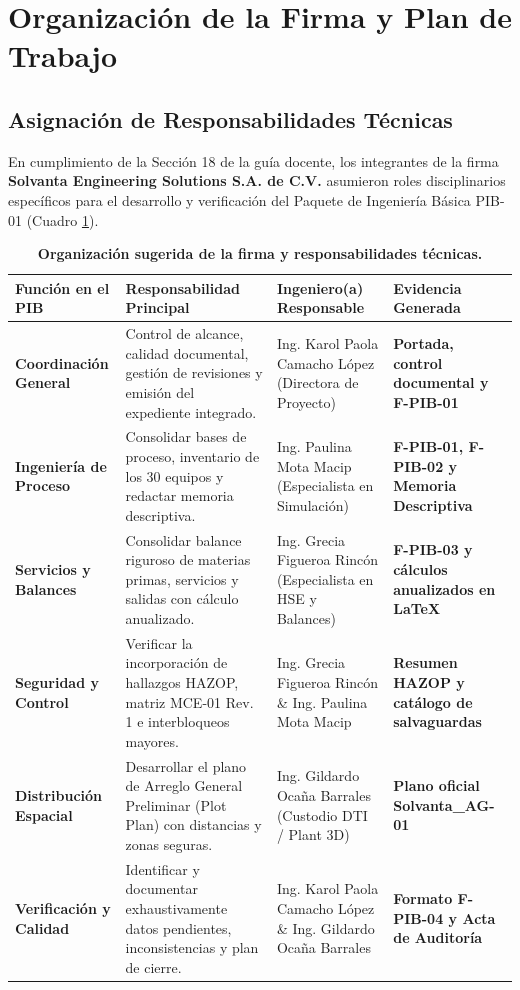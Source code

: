 \documentclass[10pt,letterpaper]{article}
\begin{document}
\section{Organización de la Firma y Plan de Trabajo}

\subsection{Asignación de Responsabilidades Técnicas}
En cumplimiento de la Sección 18 de la guía docente, los integrantes de la firma \textbf{Solvanta Engineering Solutions S.A. de C.V.} asumieron roles disciplinarios específicos para el desarrollo y verificación del Paquete de Ingeniería Básica PIB-01 (Cuadro \ref{tab:organizacion_firma}).

\begin{table}[H]
\centering\small
\setlength{\tabcolsep}{6pt}
\renewcommand{\arraystretch}{1.2}
\caption{\textbf{Organización sugerida de la firma y responsabilidades técnicas.}} \label{tab:organizacion_firma}
\begin{tabularx}{\textwidth}{>{\bfseries}p{3.5cm} p{4.2cm} X >{\bfseries}p{3.2cm}}
\toprule
\rowcolor{tableheader}
\color{white}\textbf{Función en el PIB} & \color{white}\textbf{Responsabilidad Principal} & \color{white}\textbf{Ingeniero(a) Responsable} & \color{white}\textbf{Evidencia Generada} \\
\midrule
Coordinación General & Control de alcance, calidad documental, gestión de revisiones y emisión del expediente integrado. & Ing. Karol Paola Camacho López (Directora de Proyecto) & Portada, control documental y F-PIB-01 \\ \addlinespace[2pt]
Ingeniería de Proceso & Consolidar bases de proceso, inventario de los 30 equipos y redactar memoria descriptiva. & Ing. Paulina Mota Macip (Especialista en Simulación) & F-PIB-01, F-PIB-02 y Memoria Descriptiva \\ \addlinespace[2pt]
Servicios y Balances & Consolidar balance riguroso de materias primas, servicios y salidas con cálculo anualizado. & Ing. Grecia Figueroa Rincón (Especialista en HSE y Balances) & F-PIB-03 y cálculos anualizados en LaTeX \\ \addlinespace[2pt]
Seguridad y Control & Verificar la incorporación de hallazgos HAZOP, matriz MCE-01 Rev. 1 e interbloqueos mayores. & Ing. Grecia Figueroa Rincón \& Ing. Paulina Mota Macip & Resumen HAZOP y catálogo de salvaguardas \\ \addlinespace[2pt]
Distribución Espacial & Desarrollar el plano de Arreglo General Preliminar (Plot Plan) con distancias y zonas seguras. & Ing. Gildardo Ocaña Barrales (Custodio DTI / Plant 3D) & Plano oficial Solvanta\_AG-01 \\ \addlinespace[2pt]
Verificación y Calidad & Identificar y documentar exhaustivamente datos pendientes, inconsistencias y plan de cierre. & Ing. Karol Paola Camacho López \& Ing. Gildardo Ocaña Barrales & Formato F-PIB-04 y Acta de Auditoría \\
\bottomrule
\end{tabularx}
\end{table}
\end{document}
